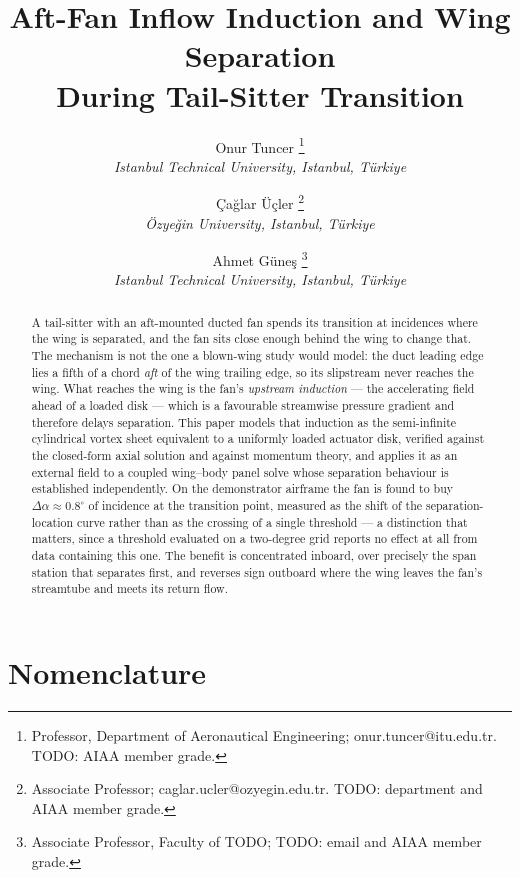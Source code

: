 \documentclass[submit]{aiaa-tc}%
\title{Aft-Fan Inflow Induction and Wing Separation\\
       During Tail-Sitter Transition}
\author{
 Onur Tuncer%
  \thanks{Professor, Department of Aeronautical Engineering;
    onur.tuncer@itu.edu.tr. TODO: AIAA member grade.}\\
 {\normalsize\itshape
  Istanbul Technical University, Istanbul, T\"urkiye}
 \and
 \c{C}a\u{g}lar \"U\c{c}ler%
  \thanks{Associate Professor; caglar.ucler@ozyegin.edu.tr.
    TODO: department and AIAA member grade.}\\
 {\normalsize\itshape
  \"Ozye\u{g}in University, Istanbul, T\"urkiye}
 \and
 Ahmet G\"une\c{s}%
  \thanks{Associate Professor, Faculty of TODO; TODO: email and AIAA
    member grade.}\\
 {\normalsize\itshape
  Istanbul Technical University, Istanbul, T\"urkiye}
}
\begin{document}
\maketitle

\begin{abstract}
A tail-sitter with an aft-mounted ducted fan spends its transition at
incidences where the wing is separated, and the fan sits close enough
behind the wing to change that. The mechanism is not the one a blown-wing
study would model: the duct leading edge lies a fifth of a chord
\emph{aft} of the wing trailing edge, so its slipstream never reaches the
wing. What reaches the wing is the fan's \emph{upstream induction} --- the
accelerating field ahead of a loaded disk --- which is a favourable
streamwise pressure gradient and therefore delays separation. This paper
models that induction as the semi-infinite cylindrical vortex sheet
equivalent to a uniformly loaded actuator disk, verified against the
closed-form axial solution and against momentum theory, and applies it as
an external field to a coupled wing--body panel solve whose separation
behaviour is established independently. On the demonstrator airframe the
fan is found to buy $\Delta\alpha \approx 0.8^\circ$ of incidence at the
transition point, measured as the shift of the separation-location curve
rather than as the crossing of a single threshold --- a distinction that
matters, since a threshold evaluated on a two-degree grid reports no
effect at all from data containing this one. The benefit is concentrated
inboard, over precisely the span station that separates first, and
reverses sign outboard where the wing leaves the fan's streamtube and
meets its return flow.
\end{abstract}

\section*{Nomenclature}
\end{document}
